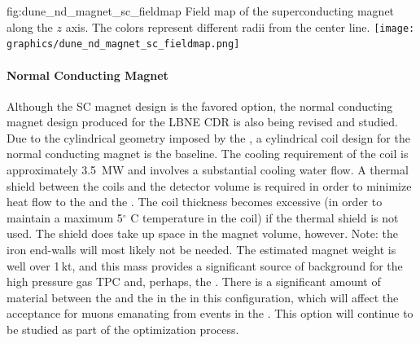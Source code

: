 %
\begin{dunefigure}{fig:dune_nd_magnet_sc_fieldmap}
{Field map of the superconducting magnet along the $z$ axis. The colors represent different radii from the center line.}
\texttt{[image: graphics/dune\_nd\_magnet\_sc\_fieldmap.png]} 
\end{dunefigure}
%
%
\paragraph{Normal Conducting Magnet}

Although the SC magnet design is the favored option, the normal conducting magnet design produced for the LBNE CDR is also being revised and studied.  Due to the cylindrical geometry imposed by the , a cylindrical coil design for the normal conducting magnet is the baseline. The cooling requirement of the coil is approximately \SI{3.5}{MW} and involves a substantial cooling water flow. A thermal shield between the coils and the detector volume is required in order to minimize heat flow to the  and the . The coil thickness becomes excessive (in order to maintain a maximum 5$^\circ$ C temperature in the coil) if the thermal shield is not used.  The shield does take up space in the magnet volume, however.  %
Note: the iron end-walls will most likely not be needed. The estimated magnet weight is well over 1\,kt, and this mass provides a significant source of background for the high pressure gas TPC and, perhaps, the  .  There is a significant amount of material between the  and the  in the  in this configuration, which will affect the acceptance for muons emanating from events in the  . This option will continue to be studied as part of the optimization process.
%
%

